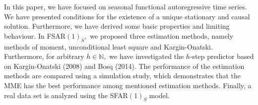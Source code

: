 \documentclass[11pt,a4paper]{article}
\numberwithin{equation}{section}
\begin{document}
In this paper, we have focused on seasonal functional autoregressive time series. We have presented conditions for the existence of a unique stationary and causal solution. Furthermore, we have derived some basic properties and limiting behaviour. In FSAR$(1)_S,$ we proposed three estimation methods, namely methods of moment, unconditional least square and Kargin-Onatski. Furthermore, for arbitrary $h\in {\mathbb{N}},$ we have investigated the $h$-step  predictor based on Kargin-Onatski (2008) and Bosq (2014). The performance of the estimation methods are compared using a simulation study, which demonstrates that the MME has the best performance among mentioned estimation methods. Finally, a real data set is analyzed using the SFAR$(1)_S$ model. 


\printbibliography
\end{document}
